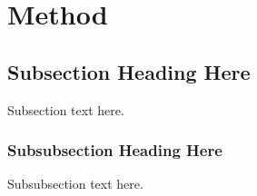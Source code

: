 \section{Method}
\label{Method}
%
\subsection{Subsection Heading Here}
Subsection text here.


\subsubsection{Subsubsection Heading Here}
Subsubsection text here.
